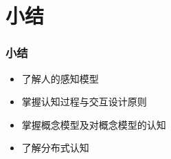 \documentclass{beamer}
\begin{document}
\section{小结}
\begin{frame}
	\frametitle{小结}
	\begin{itemize}
		\item 了解人的感知模型
		\item 掌握认知过程与交互设计原则
		\item 掌握概念模型及对概念模型的认知
		\item 了解分布式认知
	\end{itemize}
\end{frame}
 
\end{document}
